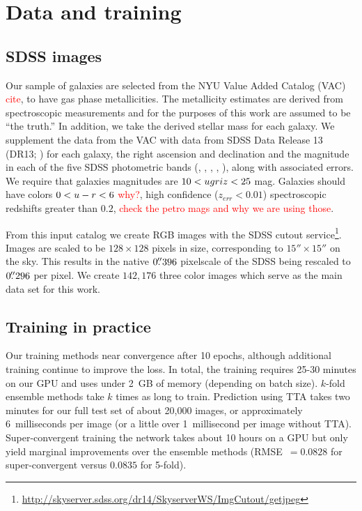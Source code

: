 \documentclass[fleqn,usenatbib]{mnras}
\newcommand{\editorial}[1]{\textcolor{red}{#1}}
\begin{document}
\section{Data and training}\label{sec:data}

\subsection{SDSS images}
Our sample of galaxies are selected from the NYU Value Added Catalog (VAC) \editorial{cite}, to have gas phase metallicities. The metallicity estimates \citep{Tremonti2004} are derived from spectroscopic measurements and for the purposes of this work are assumed to be ``the truth.'' In addition, we take the derived stellar mass for each galaxy.
We supplement the data from the VAC with data from SDSS Data Release 13 (DR13; \citealt{Albareti2017}) for each galaxy, the right ascension and declination and the magnitude in each of the five SDSS photometric bands (\sdssu, \sdssg, \sdssr, \sdssi, \sdssz), along with associated errors. We require that galaxies magnitudes are $10 < \hbox{$u$}\hbox{$g$}\hbox{$r$}\hbox{$i$}\hbox{$z$} < 25$ mag. Galaxies should have colors $0 < \hbox{$u$}-\hbox{$r$} < 6$ \editorial{why?}, high confidence ($z_{err} < 0.01$) spectroscopic redshifts greater than $0.2$, \editorial{check the petro mags and why we are using those}.

From this input catalog we create RGB images with the SDSS cutout service\footnote{\url{http://skyserver.sdss.org/dr14/SkyserverWS/ImgCutout/getjpeg}}. Images are scaled to be $128\times128$ pixels in size, corresponding to $15''\times15''$ on the sky. This results in the native $0\hbox{$.\!\!^{\prime\prime}$}396$ pixelscale of the SDSS being rescaled to $0\hbox{$.\!\!^{\prime\prime}$}296$ per pixel.
We create $142,176$ three color images which serve as the main data set for this work.

\subsection{Training in practice}

Our training methods near convergence after 10 epochs, although additional training continue to improve the loss.
In total, the training requires 25-30 minutes on our GPU and uses under 2~GB of memory (depending on batch size).
$k$-fold ensemble methods take $k$ times as long to train.
Prediction using TTA takes two minutes for our full test set of about 20,000 images, or approximately 6~milliseconds per image (or a little over 1~millisecond per image without TTA).
Super-convergent training the network takes about 10 hours on a GPU but only yield marginal improvements over the ensemble methods (RMSE~$= 0.0828$ for super-convergent versus $0.0835$ for 5-fold).
\end{document}
